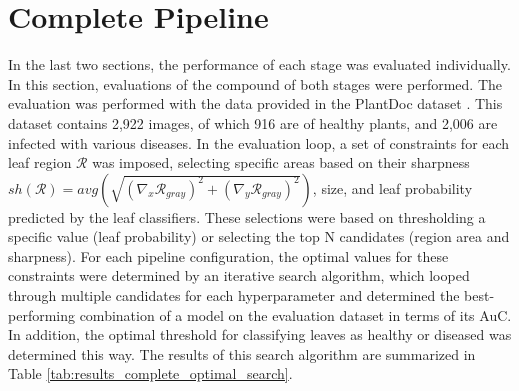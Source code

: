 \documentclass[draft,final]{vutinfth} %
\begin{document}
\section{Complete Pipeline} \label{sec:results_total}
In the last two sections, the performance of each stage was evaluated individually. In this section, evaluations of the compound of both stages were performed. The evaluation was performed with the data provided in the PlantDoc dataset \cite{singh_plantdoc_2020}. This dataset contains 2,922 images, of which 916 are of healthy plants, and 2,006 are infected with various diseases.
In the evaluation loop, a set of constraints for each leaf region $\mathcal{R}$ was imposed, selecting specific areas based on their sharpness $sh(\mathcal{R}) = avg(\sqrt{(\nabla_x \mathcal{R}_{gray})^2 + (\nabla_y \mathcal{R}_{gray})^2})$, size, and leaf probability predicted by the leaf classifiers. These selections were based on thresholding a specific value (leaf probability) or selecting the top N candidates (region area and sharpness). 
For each pipeline configuration, the optimal values for these constraints were determined by an iterative search algorithm, which looped through multiple candidates for each hyperparameter and determined the best-performing combination of a model on the evaluation dataset in terms of its AuC. In addition, the optimal threshold for classifying leaves as healthy or diseased was determined this way. The results of this search algorithm are summarized in Table \ref{tab:results_complete_optimal_search}.
\end{document}
